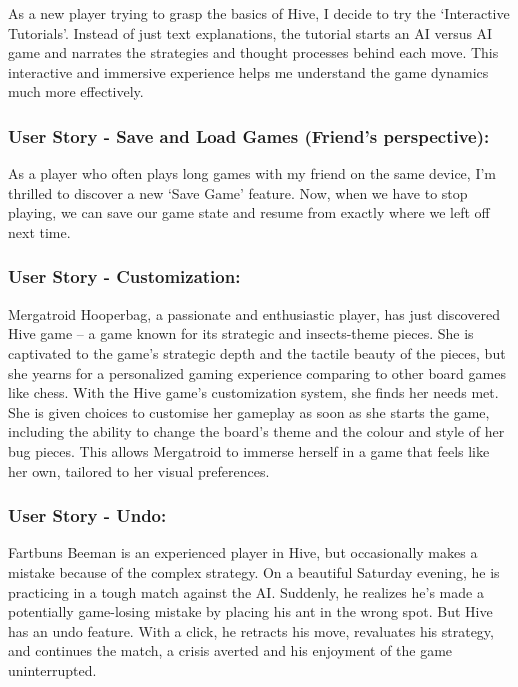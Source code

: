 \documentclass[
]{article}
\begin{document}
As a new player trying to grasp the basics of Hive, I decide to try the
`Interactive Tutorials'. Instead of just text explanations, the tutorial
starts an AI versus AI game and narrates the strategies and thought
processes behind each move. This interactive and immersive experience
helps me understand the game dynamics much more effectively.

\hypertarget{user-story---save-and-load-games-friends-perspective}{%
\subsubsection{User Story - Save and Load Games (Friend's
perspective):}\label{user-story---save-and-load-games-friends-perspective}}

As a player who often plays long games with my friend on the same
device, I'm thrilled to discover a new `Save Game' feature. Now, when we
have to stop playing, we can save our game state and resume from exactly
where we left off next time.

\hypertarget{user-story---customization}{%
\subsubsection{User Story -
Customization:}\label{user-story---customization}}

Mergatroid Hooperbag, a passionate and enthusiastic player, has just
discovered Hive game -- a game known for its strategic and insects-theme
pieces. She is captivated to the game's strategic depth and the tactile
beauty of the pieces, but she yearns for a personalized gaming
experience comparing to other board games like chess. With the Hive
game's customization system, she finds her needs met. She is given
choices to customise her gameplay as soon as she starts the game,
including the ability to change the board's theme and the colour and
style of her bug pieces. This allows Mergatroid to immerse herself in a
game that feels like her own, tailored to her visual preferences.

\hypertarget{user-story---undo}{%
\subsubsection{User Story - Undo:}\label{user-story---undo}}

Fartbuns Beeman is an experienced player in Hive, but occasionally makes
a mistake because of the complex strategy. On a beautiful Saturday
evening, he is practicing in a tough match against the AI. Suddenly, he
realizes he's made a potentially game-losing mistake by placing his ant
in the wrong spot. But Hive has an undo feature. With a click, he
retracts his move, revaluates his strategy, and continues the match, a
crisis averted and his enjoyment of the game uninterrupted.
\end{document}
